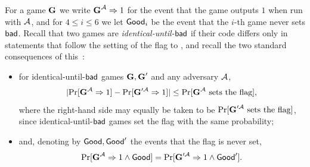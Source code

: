 For a game $\textbf{G}$ we write $\textbf{G}^{\mathcal{A}} \Rightarrow 1$ for the event that the game
outputs $1$ when run with $\mathcal{A}$, and for $4 \leq i \leq 6$ we let $\mathsf{Good}_i$ be
the event that the $i$-th game never sets $\mathsf{bad}$.
Recall that two games are \emph{identical-until-$\mathsf{bad}$} if their code differs
only in statements that follow the setting of the flag to \btrue, and recall the
two standard consequences of this~\cite{EC:BelRog06}:
\begin{itemize}
    \item for identical-until-$\mathsf{bad}$ games $\textbf{G}, \textbf{G}'$ and any adversary
        $\mathcal{A}$,
        \begin{equation}\label{eq:fundamental}
            \lvert \Pr[\textbf{G}^{\mathcal{A}} \Rightarrow 1] - \Pr[\textbf{G}'^{\mathcal{A}} \Rightarrow 1] \rvert
            \leq \Pr[\textbf{G}^{\mathcal{A}} \text{ sets the flag}],
        \end{equation}
        where the right-hand side may equally be taken to be $\Pr[\textbf{G}'^{\mathcal{A}}
        \text{ sets the flag}]$, since identical-until-$\mathsf{bad}$ games set the
        flag with the same probability;
    \item and, denoting by $\mathsf{Good}, \mathsf{Good}'$ the events that the flag is never
        set,
        \begin{equation}\label{eq:good}
            \Pr[\textbf{G}^{\mathcal{A}} \Rightarrow 1 \wedge \mathsf{Good}]
            = \Pr[\textbf{G}'^{\mathcal{A}} \Rightarrow 1 \wedge \mathsf{Good}'].
        \end{equation}
\end{itemize}
